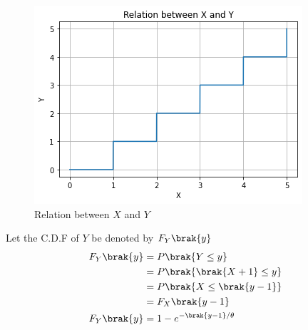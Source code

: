\documentclass[journal,12pt,twocolumn]{IEEEtran}
\begin{document}
\begin{figure}[h]
    \centering
    \includegraphics[width=\columnwidth]{Assignment_4_AI1103.png}
    \caption{Relation between $X$ and $Y$}
    \label{fig:1}
\end{figure}

Let the C.D.F of $Y$ be denoted by $F_Y\brak{y}$
\begin{align}
    F_Y\brak{y} &= P\brak{Y\leq y}\\
    &= P\brak{\brak{X+1} \leq y}\\
    &= P\brak{X \leq \brak{y-1}}\\
    &= F_X\brak{y-1}\\
    F_Y\brak{y} &= 1 - e^{-\brak{y-1}/\theta}
\end{align}
\end{document}
